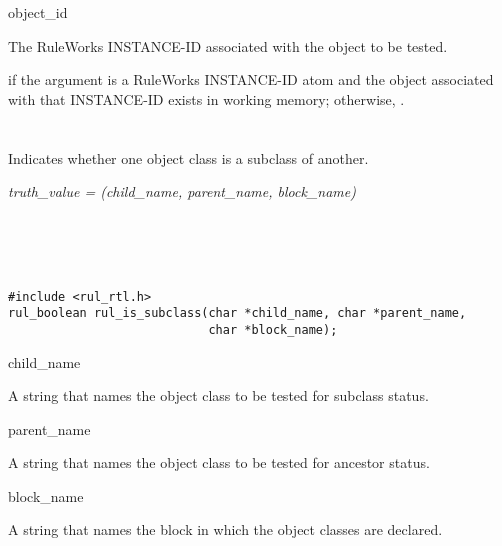 \begin{argument}
\item[object\_id]

  The RuleWorks INSTANCE-ID associated with the object to be tested.
\end{argument}

\ReturnValue

 if the argument is a RuleWorks INSTANCE-ID atom and the object
associated with that INSTANCE-ID exists in working memory; otherwise,
.

\begin{seealso}


\end{seealso}

\section*{}

Indicates whether one object class is a subclass of another.

\Syntax

\it{truth\_value} = (\it{child\_name},
\it{parent\_name}, \it{block\_name})

\begin{args}
   \\
   \\
   \\
\end{args}


\CBinding
\begin{verbatim}
#include <rul_rtl.h>
rul_boolean rul_is_subclass(char *child_name, char *parent_name,
                            char *block_name);
\end{verbatim}

\begin{arguments}
\item[child\_name]

  A string that names the object class to be tested for subclass
  status.

\item[parent\_name]

  A string that names the object class to be tested for ancestor
  status.

\item[block\_name]

  A string that names the block in which the object classes are
  declared.
\end{arguments}

